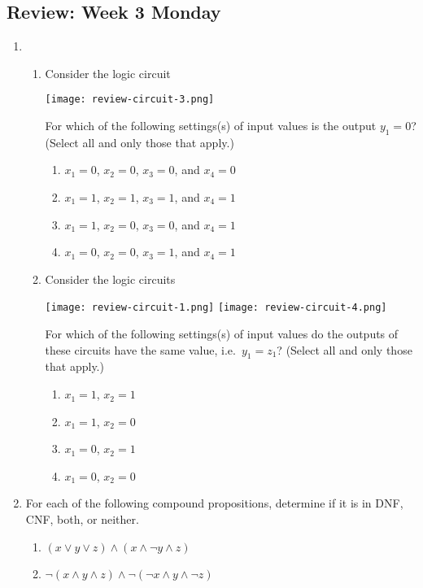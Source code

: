 \documentclass[12pt, oneside]{article}
\begin{document}
\subsection*{Review: Week 3 Monday}
\begin{enumerate}
    \item 

\begin{enumerate}
    \item Consider the logic circuit
    \begin{center}
    \texttt{[image: review-circuit-3.png]}
    \end{center}
    For which of the following settings(s) of input values is the output
    $y_1 =  0$? (Select all and only those that apply.)
    \begin{enumerate}
        \item $x_1 = 0$, $x_2 = 0$, $x_3 = 0$, and $x_4 = 0$
        \item $x_1 = 1$, $x_2 = 1$, $x_3 = 1$, and $x_4 = 1$
        \item $x_1 = 1$, $x_2 = 0$, $x_3 = 0$, and $x_4 = 1$
        \item $x_1 = 0$, $x_2 = 0$, $x_3 = 1$, and $x_4 = 1$
    \end{enumerate}
    \item Consider the logic circuits
    \begin{center}
    \texttt{[image: review-circuit-1.png]}
    \qquad \qquad \qquad
    \texttt{[image: review-circuit-4.png]}
    \end{center}
    For which  of the following settings(s) of input values do the outputs
    of these  circuits have the  same value, i.e.\ $y_1 =  z_1$? 
    (Select all and only those that apply.)
    \begin{enumerate}
        \item $x_1 = 1$, $x_2 = 1$
        \item $x_1 = 1$, $x_2 = 0$
        \item $x_1 = 0$, $x_2 = 1$
        \item $x_1 = 0$, $x_2 = 0$
    \end{enumerate}    
    
\end{enumerate}     \item 

For each of the following compound propositions, determine
if it is in DNF, CNF, both, or neither.

\begin{enumerate}
    \item $(x \lor y \lor z) \land (x \land \lnot y \land z)$
    \item $\lnot (x \land y \land z) \land \lnot (\lnot x \land y \land \lnot z)$
\end{enumerate} \end{enumerate}
\newpage
\end{document}
